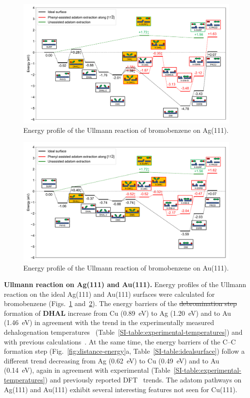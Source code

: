 \documentclass[aps,prb,amsmath,amssymb,11pt]{revtex4-1}
\newcommand{\zhzh}{\color{blue}}
\newcommand{\zhzh}{\color{blue}}
\begin{document}
\begin{figure}[bt]
\centering
\includegraphics[width=1.\textwidth]{Fig/Ag_mainfile.pdf}
\caption{Energy profile of the Ullmann reaction of bromobenzene on Ag(111).}
\label{fig:Ag_all}
\end{figure}

\begin{figure}[bt]
\centering
\includegraphics[width=1.\textwidth]{Fig/Au_mainfile.pdf}
\caption{Energy profile of the Ullmann reaction of bromobenzene on Au(111).}
\label{fig:Au_all}
\end{figure}


\textbf{Ullmann reaction on Ag(111) and Au(111).}
%
Energy profiles of the Ullmann reaction on the ideal Ag(111) and Au(111) surfaces were calculated for bromobenzene (Figs.~\ref{fig:Ag_all} and~\ref{fig:Au_all}). 
The energy barriers of the \sout{debromination step} {\zhzh formation of \textbf{DHAL}} increase from Cu (\SI{0.89}{\electronvolt}) to Ag (\SI{1.20}{\electronvolt}) and to Au (\SI{1.46}{\electronvolt}) in agreement with the trend in the experimentally measured dehalogenation temperatures~\cite{ullmann_52,ullmann_87,ullmann_67} (Table~\ref{SI-table:experimental-temperatures}) and with previous calculations~\cite{jacs2013}.
At the same time, the energy barriers of the C--C formation step (Fig.~\ref{fig:distance-energy}a, Table~\ref{SI-table:idealsurface}) follow a different trend decreasing from Ag (\SI{0.62}{\electronvolt}) to Cu (\SI{0.49}{\electronvolt}) and to Au (\SI{0.14}{\electronvolt}), again in agreement with experimental (Table~\ref{SI-table:experimental-temperatures}) and previously reported DFT~\cite{jacs2013} trends. The adatom pathways on Ag(111) and Au(111) exhibit several interesting features not seen for Cu(111).
\end{document}
